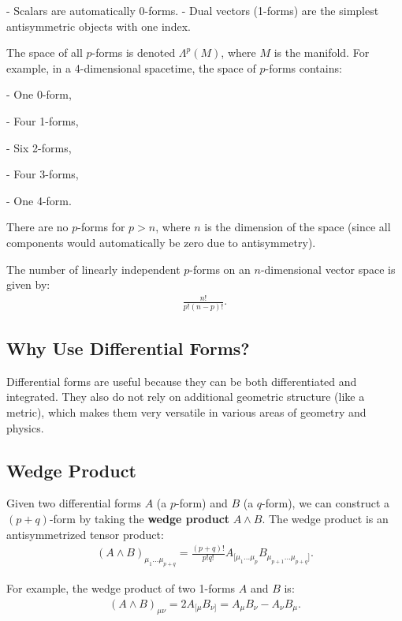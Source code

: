 \documentclass[12pt]{book}
\begin{document}
- Scalars are automatically 0-forms.
- Dual vectors (1-forms) are the simplest antisymmetric objects with one index.

The space of all \( p \)-forms is denoted \( \Lambda^p(M) \), where \( M \) is the manifold. For example, in a 4-dimensional spacetime, the space of \( p \)-forms contains:

- One 0-form,

- Four 1-forms,

- Six 2-forms,

- Four 3-forms,

- One 4-form.

There are no \( p \)-forms for \( p > n \), where \( n \) is the dimension of the space (since all components would automatically be zero due to antisymmetry).

The number of linearly independent \( p \)-forms on an \( n \)-dimensional vector space is given by:
\begin{align}
\frac{n!}{p!(n - p)!}.
\end{align}

\subsection{Why Use Differential Forms?}
Differential forms are useful because they can be both differentiated and integrated. They also do not rely on additional geometric structure (like a metric), which makes them very versatile in various areas of geometry and physics.

\subsection{Wedge Product}

Given two differential forms \( A \) (a \( p \)-form) and \( B \) (a \( q \)-form), we can construct a \( (p + q) \)-form by taking the \textbf{wedge product} \( A \wedge B \). The wedge product is an antisymmetrized tensor product:
\begin{align}
(A \wedge B)_{\mu_1 \dots \mu_{p+q}} = \frac{(p + q)!}{p! q!} A_{[\mu_1 \dots \mu_p} B_{\mu_{p+1} \dots \mu_{p+q}]}.
\end{align}


For example, the wedge product of two 1-forms \( A \) and \( B \) is:
\begin{align}
(A \wedge B)_{\mu\nu} = 2 A_{[\mu} B_{\nu]} = A_\mu B_\nu - A_\nu B_\mu.
\end{align}
\end{document}

